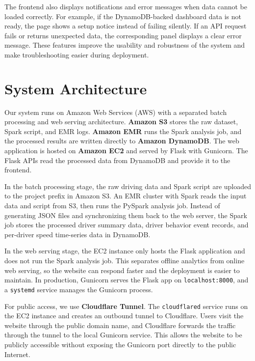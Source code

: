 \documentclass[12pt,a4paper]{article}
\begin{document}
The frontend also displays notifications and error messages when data cannot be loaded correctly. For example, if the DynamoDB-backed dashboard data is not ready, the page shows a setup notice instead of failing silently. If an API request fails or returns unexpected data, the corresponding panel displays a clear error message. These features improve the usability and robustness of the system and make troubleshooting easier during deployment.

\section{System Architecture}

Our system runs on Amazon Web Services (AWS) with a separated batch processing and web serving architecture. \textbf{Amazon S3} stores the raw dataset, Spark script, and EMR logs. \textbf{Amazon EMR} runs the Spark analysis job, and the processed results are written directly to \textbf{Amazon DynamoDB}. The web application is hosted on \textbf{Amazon EC2} and served by Flask with Gunicorn. The Flask APIs read the processed data from DynamoDB and provide it to the frontend.

In the batch processing stage, the raw driving data and Spark script are uploaded to the project prefix in Amazon S3. An EMR cluster with Spark reads the input data and script from S3, then runs the PySpark analysis job. Instead of generating JSON files and synchronizing them back to the web server, the Spark job stores the processed driver summary data, driver behavior event records, and per-driver speed time-series data in DynamoDB.

In the web serving stage, the EC2 instance only hosts the Flask application and does not run the Spark analysis job. This separates offline analytics from online web serving, so the website can respond faster and the deployment is easier to maintain. In production, Gunicorn serves the Flask app on \texttt{localhost:8000}, and a \texttt{systemd} service manages the Gunicorn process.

For public access, we use \textbf{Cloudflare Tunnel}. The \texttt{cloudflared} service runs on the EC2 instance and creates an outbound tunnel to Cloudflare. Users visit the website through the public domain name, and Cloudflare forwards the traffic through the tunnel to the local Gunicorn service. This allows the website to be publicly accessible without exposing the Gunicorn port directly to the public Internet.
\end{document}
